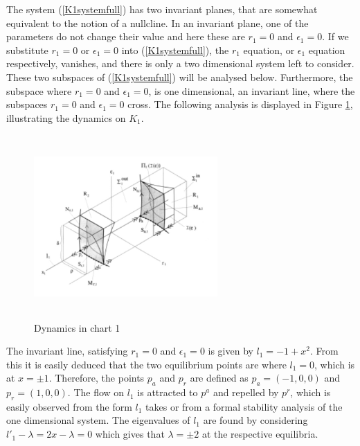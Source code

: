 The system (\ref{K1systemfull}) has two invariant planes, that are somewhat equivalent to the notion of a nullcline. In an invariant plane, one of the parameters do not change their value and here these are $r_1=0$ and $\epsilon_1=0$.
If we substitute $r_1=0$ or $\epsilon_1=0$ into (\ref{K1systemfull}), the $r_1$ equation, or $\epsilon_1$ equation respectively, vanishes, and there is only a two dimensional system left to consider. These two subspaces of (\ref{K1systemfull}) will be analysed below. Furthermore, the subspace where $r_1=0$ and $\epsilon_1=0$, is one dimensional, an invariant line, where the subspaces $r_1=0$ and $\epsilon_1=0$ cross.
The following analysis is displayed in Figure \ref{fig:k1chart}, illustrating the dynamics on $K_1$.
\begin{figure}[h!]
	\centering
	\includegraphics[height=7cm,width=7cm]{Images/K1Chart}
	\caption{Dynamics in chart 1 \citep{krupa2001}}
		\label{fig:k1chart}
\end{figure}\newpage


The invariant line, satisfying $r_1=0$ and $\epsilon_1=0$ is given by $l_1= -1 +x^2$. From this it is easily deduced that the two equilibrium points are where $l_1=0$, which is at $x=\pm1$. Therefore, the points $p_a$ and $p_r$ are defined as $p_a= (-1,0,0)$ and $p_r=(1,0,0)$. The flow on $l_1$ is attracted to $p^a$ and repelled by $p^r$, which is easily observed from the form $l_1$ takes or from a formal stability analysis of the one dimensional system. The eigenvalues of $l_1$ are found  by considering $l'_1 - \lambda = 2x - \lambda= 0 $ which gives that $\lambda = \pm 2$ at the respective equilibria.
 

